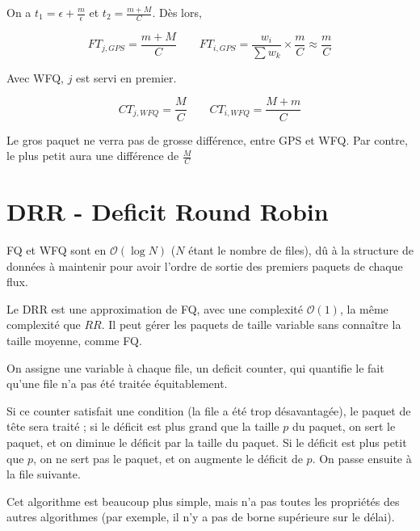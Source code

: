 			On a $t_1 = \epsilon + \frac{m}{\epsilon}$ et $t_2 = \frac{m + M}{C}$. Dès lors,
			
			$$FT_{j, GPS} = \frac{m + M}{C} \quad \quad FT_{i, GPS} = \frac{w_i}{\sum w_k} \times \frac{m}{C} \approx \frac{m}{C}$$
		
		
		
			Avec WFQ, $j$ est servi en premier.
		
			
			$$CT_{j, WFQ} = \frac{M}{C} \quad \quad CT_{i, WFQ} = \frac{M + m}{C}$$
			
			
			Le gros paquet ne verra pas de grosse différence, entre GPS et WFQ. Par contre, le plus petit aura une différence de $ \frac{M}{C} $
			
			\section{DRR - Deficit Round Robin}
			
			FQ et WFQ sont en $\mathcal{O}(\log N)$ ($N$ étant le nombre de files), dû à la structure de données à maintenir pour avoir l'ordre de sortie des premiers paquets de chaque flux.%
			
			Le DRR est une approximation de FQ, avec une complexité $\mathcal{O}(1)$, la même complexité que $RR$. Il peut gérer les paquets de taille variable sans connaître la taille moyenne, comme FQ.
			
			On assigne une variable à chaque file, un deficit counter, qui quantifie le fait qu'une file n'a pas été traitée équitablement. 
			
			Si ce counter satisfait une condition (la file a été trop désavantagée), le paquet de tête sera traité ; si le déficit est plus grand que la taille $p$ du paquet, on sert le paquet, et on diminue le déficit par la taille du paquet. Si le déficit est plus petit que $p$, on ne sert pas le paquet, et on augmente le déficit de $p$. On passe ensuite à la file suivante.			
			
			
			Cet algorithme est beaucoup plus simple, mais n'a pas toutes les propriétés des autres algorithmes (par exemple, il n'y a pas de borne supérieure sur le délai).
		